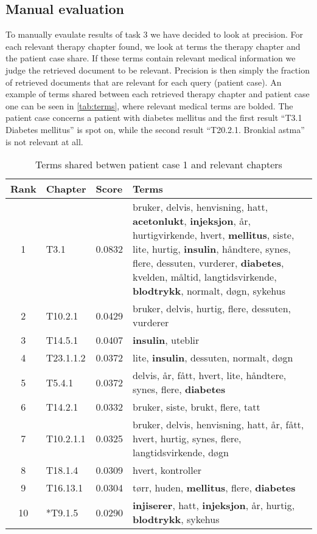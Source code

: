 \documentclass[a4paper, 11pt]{article}
\begin{document}
\subsection{Manual evaluation}
To manually evaulate results of task 3 we have decided to look at precision.
For each relevant therapy chapter found, we look at terms the therapy chapter
and the patient case share. If these terms contain relevant medical
information we judge the retrieved document to be relevant. Precision is then
simply the fraction of retrieved documents that are relevant for each query
(patient case). An example of terms shared between each retrieved therapy
chapter and patient case one can be seen in \autoref{tab:terms}, where
relevant medical terms are bolded. The patient case concerns a patient with
diabetes mellitus and the first result ``T3.1 Diabetes mellitus'' is spot on,
while the second result ``T20.2.1. Bronkial astma'' is not relevant at all.
\begin{table}[htbp] \footnotesize \center
\caption{Terms shared betwen patient case 1 and relevant chapters\label{tab:terms}}
\begin{tabularx}{\textwidth}{c l l X}
    \toprule
    Rank & Chapter & Score & Terms \\
    \midrule
	1 & T3.1 & 0.0832 & bruker, delvis, henvisning, hatt, \textbf{acetonlukt}, \textbf{injeksjon}, år, hurtigvirkende, hvert, \textbf{mellitus}, siste, lite, hurtig, \textbf{insulin}, håndtere, synes, flere, dessuten, vurderer, \textbf{diabetes}, kvelden, måltid, langtidsvirkende, \textbf{blodtrykk}, normalt, døgn, sykehus \\
	2 & T10.2.1 & 0.0429 & bruker, delvis, hurtig, flere, dessuten, vurderer \\
	3 & T14.5.1 & 0.0407 & \textbf{insulin}, uteblir \\
	4 & T23.1.1.2 & 0.0372 & lite, \textbf{insulin}, dessuten, normalt, døgn \\
	5 & T5.4.1 & 0.0372 & delvis, år, fått, hvert, lite, håndtere, synes, flere, \textbf{diabetes} \\
	6 & T14.2.1 & 0.0332 & bruker, siste, brukt, flere, tatt \\
	7 & T10.2.1.1 & 0.0325 & bruker, delvis, henvisning, hatt, år, fått, hvert, hurtig, synes, flere, langtidsvirkende, døgn \\
	8 & T18.1.4 & 0.0309 & hvert, kontroller \\
	9 & T16.13.1 & 0.0304 & tørr, huden, \textbf{mellitus}, flere, \textbf{diabetes} \\
	10 & *T9.1.5 & 0.0290 & \textbf{injiserer}, hatt, \textbf{injeksjon}, år, hurtig, \textbf{blodtrykk}, sykehus \\
	\bottomrule
\end{tabularx}
\end{table}
\end{document}
